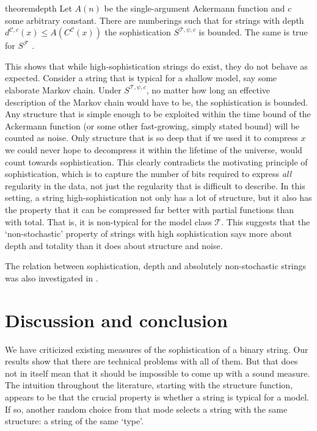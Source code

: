 \documentclass{style/llncs}
\newcommand{\C}{\mathscr C}
\newcommand{\T}{\mathscr T}
\newcommand{\F}{\mathscr F}
\newcommand{\s}{S}
\begin{document}
\begin{restatable}{theorem}{depth}
Let $A(n)$ be the single-argument Ackermann function and $c$ some arbitrary constant. There are numberings such that for strings with depth $d^{\C,c}(x) \leq A(C^\C(x))$ the sophistication $\s^{\T, \psi, c}$ is bounded. The same is true for $\s^{\F}$ .
\end{restatable}
\noindent This shows that while high-sophistication strings do exist, they do not behave as expected. Consider a string that is typical for a shallow model, say some elaborate Markov chain. Under $\s^{\T,\psi,c}$, no matter how long an effective description of the Markov chain would have to be, the sophistication is bounded. Any structure that is simple enough to be exploited within the time bound of the Ackermann function (or some other fast-growing, simply stated bound) will be counted as noise. Only structure that is so deep that if we used it to compress $x$ we could never hope to decompress it within the lifetime of the universe, would count towards sophistication. 
This clearly contradicts the motivating principle of sophistication, which is to capture the number of bits required to express \emph{all} regularity in the data, not just the regularity that is difficult to describe. 
In this setting, a string high-sophistication not only has a lot of structure, but it also has the property that it can be compressed far better with partial functions than with total. That is, it is non-typical for the model class $\T$. This suggests that the `non-stochastic' property of strings with high sophistication \cite{shen1983concept,vereshchagin2004kolmogorov} says more about depth and totality than it does about structure and noise.

The relation between sophistication, depth and absolutely non-stochastic strings was also investigated in \cite{antunes2013sophistication}.

\section{Discussion and conclusion}
\label{section:conclusion} 

We have criticized existing measures of the sophistication of a binary string. Our results show that there are technical problems with all of them. But that does not in itself mean that it should be impossible to come up with a sound measure. The intuition throughout the literature, starting with the structure function, appears to be that the crucial property is whether a string is typical for a model. If so, another random choice from that mode selects a string with the same structure: a string of the same `type'.
\end{document}
